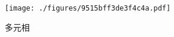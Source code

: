 
\begin{figure}[ht]
\centering
\texttt{[image: ./figures/9515bff3de3f4c4a.pdf]}
\caption{多元相} \label{fig_IMCPTV_1}
\end{figure}
